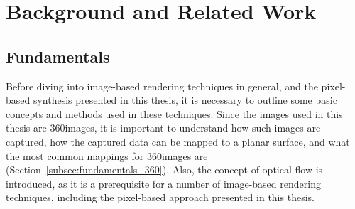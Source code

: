 \chapter{Background and Related Work}

%
\section{Fundamentals}
Before diving into image-based rendering techniques in general, and the pixel-based synthesis presented in this thesis, it is necessary to outline some basic concepts and methods used in these techniques. Since the images used in this thesis are 360\degree images, it is important to understand how such images are captured, how the captured data can be mapped to a planar surface, and what the most common mappings for 360\degree images are (Section~\ref{subsec:fundamentals_360}). Also, the concept of optical flow is introduced, as it is a prerequisite for a number of image-based rendering techniques, including the pixel-based approach presented in this thesis.

